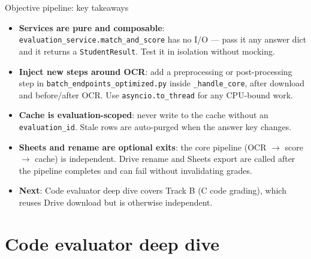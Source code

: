 \documentclass[aspectratio=169]{beamer}
\begin{document}
\begin{frame}{Objective pipeline: key takeaways}
  \small
  \begin{itemize}\setlength\itemsep{0.3em}
    \item \textbf{Services are pure and composable}: \texttt{evaluation\_service.match\_and\_score} has no I/O --- pass it any answer dict and it returns a \texttt{StudentResult}. Test it in isolation without mocking.
    \item \textbf{Inject new steps around OCR}: add a preprocessing or post-processing step in \texttt{batch\_endpoints\_optimized.py} inside \texttt{\_handle\_core}, after download and before/after OCR. Use \texttt{asyncio.to\_thread} for any CPU-bound work.
    \item \textbf{Cache is evaluation-scoped}: never write to the cache without an \texttt{evaluation\_id}. Stale rows are auto-purged when the answer key changes.
    \item \textbf{Sheets and rename are optional exits}: the core pipeline (OCR $\rightarrow$ score $\rightarrow$ cache) is independent. Drive rename and Sheets export are called after the pipeline completes and can fail without invalidating grades.
    \item \textbf{Next}: Code evaluator deep dive covers Track B (C code grading), which reuses Drive download but is otherwise independent.
  \end{itemize}
\end{frame}

\section{Code evaluator deep dive}
\end{document}
